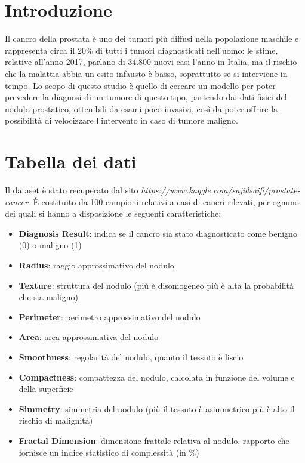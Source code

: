 \documentclass[11pt,a4paper,oneside]{article}
\begin{document}
\baselineskip 22pt


\tableofcontents\thispagestyle{empty}\clearpage

\section{Introduzione}
\baselineskip 12pt
Il cancro della prostata è uno dei tumori più diffusi nella popolazione maschile e rappresenta circa il 20\% di tutti i tumori diagnosticati nell'uomo: le stime, relative all'anno 2017, parlano di 34.800 nuovi casi l'anno in Italia, ma il rischio che la malattia abbia un esito infausto è basso, soprattutto se si interviene in tempo.
Lo scopo di questo studio è quello di cercare un modello per poter prevedere la diagnosi di un tumore di questo tipo, partendo dai dati fisici del nodulo prostatico, ottenibili da esami poco invasivi, così da poter offrire la possibilità di velocizzare l'intervento in caso di tumore maligno.

\section{Tabella dei dati}
Il dataset è stato recuperato dal sito \emph{https://www.kaggle.com/sajidsaifi/prostate-cancer}. È costituito da 100 campioni relativi a casi di cancri rilevati, per ognuno dei quali si hanno a disposizione le seguenti caratteristiche:
\begin{itemize}
\item \textbf{Diagnosis Result}: indica se il cancro sia stato diagnosticato come benigno (0) o maligno (1)
\item \textbf{Radius}: raggio approssimativo del nodulo
\item \textbf{Texture}: struttura del nodulo (più è disomogeneo più è alta la probabilità che sia maligno)
\item \textbf{Perimeter}: perimetro approssimativo del nodulo
\item \textbf{Area}: area approssimativa del nodulo
\item \textbf{Smoothness}: regolarità del nodulo, quanto il tessuto è liscio
\item \textbf{Compactness}: compattezza del nodulo, calcolata in funzione del volume e della superficie
\item \textbf{Simmetry}: simmetria del nodulo (più il tessuto è asimmetrico più è alto il rischio di malignità)
\item \textbf{Fractal Dimension}: dimensione frattale relativa al nodulo, rapporto che fornisce un indice statistico di complessità (in \%)
\end{itemize}
\end{document}
